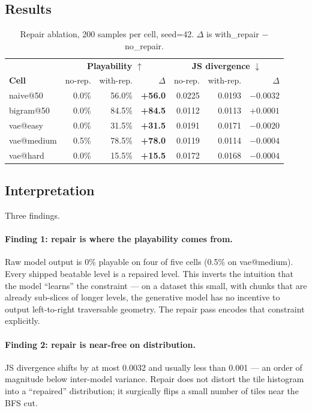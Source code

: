 \documentclass[11pt]{article}
\begin{document}
\subsection{Results}

\begin{table}[h]
\centering
\small
\caption{Repair ablation, 200 samples per cell, seed=42. $\Delta$ is
with\_repair $-$ no\_repair.}
\label{tab:ablation}
\begin{tabular}{lrrr|rrr}
\toprule
 & \multicolumn{3}{c|}{\textbf{Playability} $\uparrow$} & \multicolumn{3}{c}{\textbf{JS divergence} $\downarrow$} \\
\textbf{Cell} & no-rep. & with-rep. & $\Delta$ & no-rep. & with-rep. & $\Delta$ \\
\midrule
naive@50    & 0.0\% & 56.0\% & \textbf{+56.0} & 0.0225 & 0.0193 & $-0.0032$ \\
bigram@50   & 0.0\% & 84.5\% & \textbf{+84.5} & 0.0112 & 0.0113 & $+0.0001$ \\
vae@easy    & 0.0\% & 31.5\% & \textbf{+31.5} & 0.0191 & 0.0171 & $-0.0020$ \\
vae@medium  & 0.5\% & 78.5\% & \textbf{+78.0} & 0.0119 & 0.0114 & $-0.0004$ \\
vae@hard    & 0.0\% & 15.5\% & \textbf{+15.5} & 0.0172 & 0.0168 & $-0.0004$ \\
\bottomrule
\end{tabular}
\end{table}

\subsection{Interpretation}
Three findings.

\paragraph{Finding 1: repair is where the playability comes from.}
Raw model output is 0\% playable on four of five cells (0.5\% on
vae@medium). Every shipped beatable level is a repaired level. This
inverts the intuition that the model ``learns'' the constraint --- on
a dataset this small, with chunks that are already sub-slices of
longer levels, the generative model has no incentive to output
left-to-right traversable geometry. The repair pass encodes that
constraint explicitly.

\paragraph{Finding 2: repair is near-free on distribution.}
JS divergence shifts by at most 0.0032 and usually less than 0.001 ---
an order of magnitude below inter-model variance. Repair does not
distort the tile histogram into a ``repaired'' distribution; it
surgically flips a small number of tiles near the BFS cut.
\end{document}
